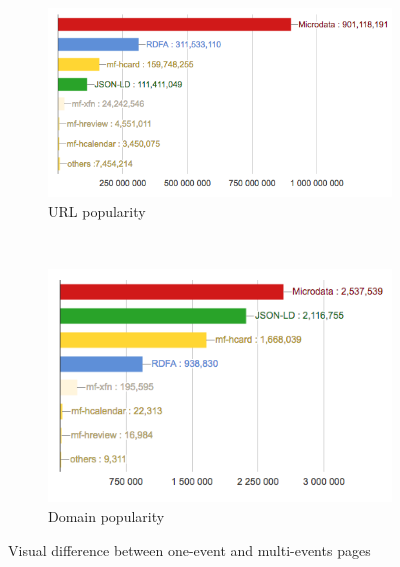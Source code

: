 \begin{figure}[H]
\begin{subfigure}{1\textwidth}
  \centering
  \includegraphics[width=.9\linewidth]{figures02/urls_meta}
  \caption{URL popularity}
\end{subfigure} \\
\begin{subfigure}{1\textwidth}
  \centering
  \includegraphics[width=.9\linewidth]{figures02/domain_meta}
  \caption{Domain popularity}
\end{subfigure}
\caption{Visual difference between one-event and multi-events pages}
\label{fig:onemulti}
\end{figure}





